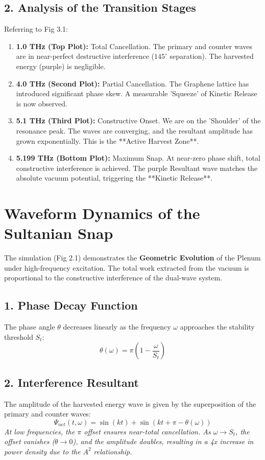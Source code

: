 \documentclass[11pt]{article}
\begin{document}
\subsection*{2. Analysis of the Transition Stages}
Referring to Fig 3.1:
\begin{enumerate}
    \item \textbf{1.0 THz (Top Plot):} Total Cancellation. The primary and counter waves are in near-perfect destructive interference ($145^\circ$ separation). The harvested energy (purple) is negligible.
    \item \textbf{4.0 THz (Second Plot):} Partial Cancellation. The Graphene lattice has introduced significant phase skew. A measurable 'Squeeze' of Kinetic Release is now observed.
    \item \textbf{5.1 THz (Third Plot):} Constructive Onset. We are on the 'Shoulder' of the resonance peak. The waves are converging, and the resultant amplitude has grown exponentially. This is the **Active Harvest Zone**.
    \item \textbf{5.199 THz (Bottom Plot):} Maximum Snap. At near-zero phase shift, total constructive interference is achieved. The purple Resultant wave matches the absolute vacuum potential, triggering the **Kinetic Release**.
\end{enumerate}

\section*{Waveform Dynamics of the Sultanian Snap}

The simulation (Fig 2.1) demonstrates the \textbf{Geometric Evolution} of the Plenum under high-frequency excitation. The total work extracted from the vacuum is proportional to the constructive interference of the dual-wave system.

\subsection*{1. Phase Decay Function}
The phase angle $\theta$ decreases linearly as the frequency $\omega$ approaches the stability threshold $S_t$:
\begin{equation}
    \theta(\omega) = \pi \left( 1 - \frac{\omega}{S_t} \right)
\end{equation}

\subsection*{2. Interference Resultant}
The amplitude of the harvested energy wave is given by the superposition of the primary and counter waves:
\begin{equation}
    \Psi_{net}(t, \omega) = \sin(kt) + \sin(kt + \pi - \theta(\omega))
\end{equation}
\textit{At low frequencies, the $\pi$ offset ensures near-total cancellation. As $\omega \to S_t$, the offset vanishes ($\theta \to 0$), and the amplitude doubles, resulting in a 4x increase in power density due to the $A^2$ relationship.}
\end{document}
